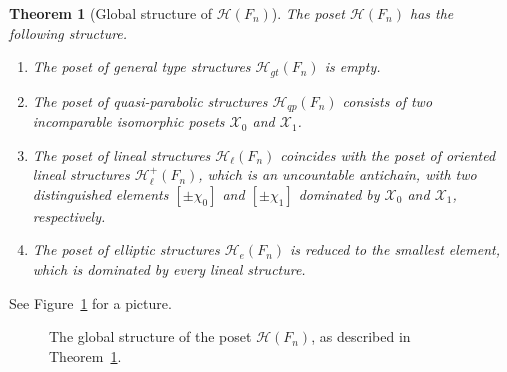 \documentclass[10pt,a4paper]{article}
\theoremstyle{definition}
\theoremstyle{remark}
\newcommand{\Hyp}{\mathcal{H}}
\newcommand{\X}{\mathcal{X}}
\theoremstyle{plain}
\newtheorem{thmA}{Theorem}
\begin{document}
\begin{thmA}[Global structure of $\Hyp(F_n)$]
\label{intro:thm:global}
The poset $\Hyp(F_n)$ has the following structure.
\begin{enumerate}
   \item The poset of general type structures $\Hyp_{gt}(F_n)$ is empty.
   \item The poset of quasi-parabolic structures $\Hyp_{qp}(F_n)$ consists of two incomparable isomorphic posets $\X_0$ and $\X_1$.
   \item The poset of lineal structures $\Hyp_{\ell}(F_n)$ coincides with the poset of oriented lineal structures $\Hyp_{\ell}^+(F_n)$, which is an uncountable antichain, with two distinguished elements $[\pm\chi_0]$ and $[\pm\chi_1]$ dominated by $\X_0$ and $\X_1$, respectively.
   \item The poset of elliptic structures $\Hyp_e(F_n)$ is reduced to the smallest element, which is dominated by every lineal structure.
\end{enumerate}
\end{thmA}

See Figure~\ref{intro:fig:global} for a picture.

\begin{figure}[htb]
\centering
{}
\caption{The global structure of the poset $\Hyp(F_n)$, as described in Theorem~\ref{intro:thm:global}.}
\label{intro:fig:global}
\end{figure}
\end{document}
